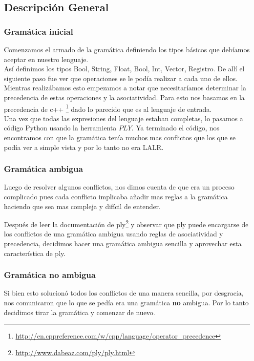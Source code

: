 \subsection{Descripción General}
\subsubsection{Gramática inicial}
Comenzamos el armado de la gramática definiendo los tipos básicos que debíamos aceptar en nuestro lenguaje.
\\
Así definimos los tipos Bool, String, Float, Bool, Int, Vector, Registro. De allí el siguiente paso fue ver que operaciones se le podía realizar a cada uno de ellos.
\\
Mientras realizábamos esto empezamos a notar que necesitaríamos determinar la precedencia de estas operaciones y la asociatividad. Para esto nos basamos en la precedencia de c++ \footnote{\url{http://en.cppreference.com/w/cpp/language/operator_precedence}} dado lo parecido que es al lenguaje de entrada.
\\

Una vez que todas las expresiones del lenguaje estaban completas, lo pasamos a código Python usando la herramienta $PLY$. Ya terminado el código, nos encontramos con que la gramática tenía muchos mas conflictos que los que se podía ver a simple vista y por lo tanto no era LALR. 

\subsubsection{Gramática ambigua}

Luego de resolver algunos conflictos, nos dimos cuenta de que era un proceso complicado pues cada conflicto implicaba añadir mas reglas a la gramática haciendo que sea mas compleja y difícil de entender.

Después de leer la documentación de ply\footnote{ \url{http://www.dabeaz.com/ply/ply.html}} y observar que ply puede encargarse de los conflictos de una gramática ambigua usando reglas de asociatividad y precedencia, decidimos hacer una gramática ambigua sencilla y aprovechar esta característica de ply.

\subsubsection{Gramática no ambigua}

Si bien esto solucionó todos los conflictos de una manera sencilla, por desgracia, nos comunicaron que lo que se pedía era una gramática \textbf{no} ambigua. Por lo tanto decidimos tirar la gramática y comenzar de nuevo.

